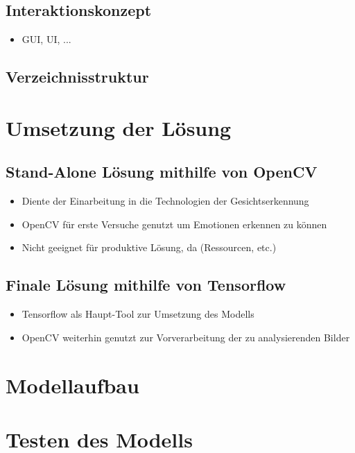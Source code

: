\documentclass[12pt, a4paper]{scrbook}
\begin{document}
\subsection{Interaktionskonzept}
\begin{itemize}
\item GUI, UI, ...
\end{itemize}

\subsection{Verzeichnisstruktur}


\section{Umsetzung der Lösung}

\subsection{Stand-Alone Lösung mithilfe von OpenCV}
\begin{itemize}
\item Diente der Einarbeitung in die Technologien der Gesichtserkennung
\item OpenCV für erste Versuche genutzt um Emotionen erkennen zu können
\item Nicht geeignet für produktive Lösung, da (Ressourcen, etc.)
\end{itemize}

\subsection{Finale Lösung mithilfe von Tensorflow}
\begin{itemize}
\item Tensorflow als Haupt-Tool zur Umsetzung des Modells
\item OpenCV weiterhin genutzt zur Vorverarbeitung der zu analysierenden Bilder
\end{itemize}


\section{Modellaufbau}


\section{Testen des Modells}

\end{document}
